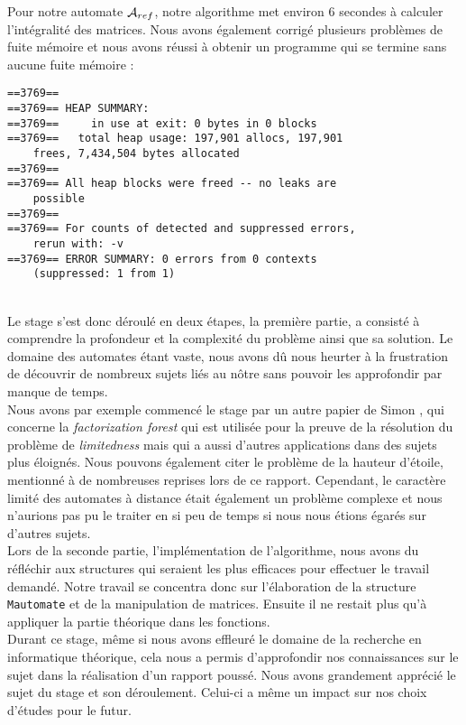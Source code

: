 \documentclass[12pt]{memoir}
\begin{document}
Pour notre automate $\mathcal{A}_{ref}$, notre algorithme met environ 6 secondes à calculer l'intégralité des matrices. Nous avons également corrigé plusieurs problèmes de fuite mémoire et nous avons réussi à obtenir un programme qui se termine sans aucune fuite mémoire :\\

\begin{lstlisting}[frame=single]
==3769== 
==3769== HEAP SUMMARY:
==3769==     in use at exit: 0 bytes in 0 blocks
==3769==   total heap usage: 197,901 allocs, 197,901 
	frees, 7,434,504 bytes allocated
==3769== 
==3769== All heap blocks were freed -- no leaks are 
	possible
==3769== 
==3769== For counts of detected and suppressed errors, 
	rerun with: -v
==3769== ERROR SUMMARY: 0 errors from 0 contexts 
	(suppressed: 1 from 1)
\end{lstlisting}
$ $\\\\

Le stage s'est donc déroulé en deux étapes, la première partie, a consisté à comprendre la profondeur et la complexité du problème ainsi que sa solution. Le domaine des automates étant vaste, nous avons dû nous heurter à la frustration de découvrir de nombreux sujets liés au nôtre sans pouvoir les approfondir par manque de temps.\\
Nous avons par exemple commencé le stage par un autre papier de Simon \cite{Bojanczyk:Factorization-Forests:2009:a}, qui concerne la \textit{factorization forest} qui est utilisée pour la preuve de la résolution du problème de \textit{limitedness} mais qui a aussi d'autres applications dans des sujets plus éloignés. Nous pouvons également citer le problème de la hauteur d'étoile, mentionné à de nombreuses reprises lors de ce rapport. Cependant, le caractère limité des automates	 à distance était également un problème complexe et nous n'aurions pas pu le traiter en si peu de temps si nous nous étions égarés sur d'autres sujets.\\
Lors de la seconde partie, l'implémentation de l'algorithme, nous avons du réfléchir aux structures qui seraient les plus efficaces pour effectuer le travail demandé. Notre travail se concentra donc sur l'élaboration de la structure \verb?Mautomate? et de la manipulation de matrices. Ensuite il ne restait plus qu'à appliquer la partie théorique dans les fonctions.\\

Durant ce stage, même si nous avons effleuré le domaine de la recherche en informatique théorique, cela nous a permis d'approfondir nos connaissances sur le sujet dans la réalisation d'un rapport poussé. Nous avons grandement apprécié le sujet du stage et son déroulement. Celui-ci a même un impact sur nos choix d'études pour le futur.\\



\end{document}
